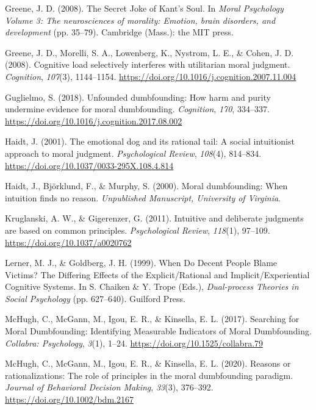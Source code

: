 \documentclass[
  american,
  man,floatsintext]{apa7}
\begin{document}
\leavevmode\hypertarget{ref-greene_secret_2008}{}%
Greene, J. D. (2008). The Secret Joke of Kant's Soul. In \emph{Moral Psychology Volume 3: The neurosciences of morality: Emotion, brain disorders, and development} (pp. 35--79). Cambridge (Mass.): the MIT press.

\leavevmode\hypertarget{ref-greene_cognitive_2008}{}%
Greene, J. D., Morelli, S. A., Lowenberg, K., Nystrom, L. E., \& Cohen, J. D. (2008). Cognitive load selectively interferes with utilitarian moral judgment. \emph{Cognition}, \emph{107}(3), 1144--1154. \url{https://doi.org/10.1016/j.cognition.2007.11.004}

\leavevmode\hypertarget{ref-guglielmo_unfounded_2018}{}%
Guglielmo, S. (2018). Unfounded dumbfounding: How harm and purity undermine evidence for moral dumbfounding. \emph{Cognition}, \emph{170}, 334--337. \url{https://doi.org/10.1016/j.cognition.2017.08.002}

\leavevmode\hypertarget{ref-haidt_emotional_2001}{}%
Haidt, J. (2001). The emotional dog and its rational tail: A social intuitionist approach to moral judgment. \emph{Psychological Review}, \emph{108}(4), 814--834. \url{https://doi.org/10.1037/0033-295X.108.4.814}

\leavevmode\hypertarget{ref-haidt_moral_2000}{}%
Haidt, J., Björklund, F., \& Murphy, S. (2000). Moral dumbfounding: When intuition finds no reason. \emph{Unpublished Manuscript, University of Virginia}.

\leavevmode\hypertarget{ref-kruglanski_intuitive_2011}{}%
Kruglanski, A. W., \& Gigerenzer, G. (2011). Intuitive and deliberate judgments are based on common principles. \emph{Psychological Review}, \emph{118}(1), 97--109. \url{https://doi.org/10.1037/a0020762}

\leavevmode\hypertarget{ref-lerner_when_1999}{}%
Lerner, M. J., \& Goldberg, J. H. (1999). When Do Decent People Blame Victims? The Differing Effects of the Explicit/Rational and Implicit/Experiential Cognitive Systems. In S. Chaiken \& Y. Trope (Eds.), \emph{Dual-process Theories in Social Psychology} (pp. 627--640). Guilford Press.

\leavevmode\hypertarget{ref-mchugh_searching_2017a}{}%
McHugh, C., McGann, M., Igou, E. R., \& Kinsella, E. L. (2017). Searching for Moral Dumbfounding: Identifying Measurable Indicators of Moral Dumbfounding. \emph{Collabra: Psychology}, \emph{3}(1), 1--24. \url{https://doi.org/10.1525/collabra.79}

\leavevmode\hypertarget{ref-mchugh_reasons_2020}{}%
McHugh, C., McGann, M., Igou, E. R., \& Kinsella, E. L. (2020). Reasons or rationalizations: The role of principles in the moral dumbfounding paradigm. \emph{Journal of Behavioral Decision Making}, \emph{33}(3), 376--392. \url{https://doi.org/10.1002/bdm.2167}
\end{document}
